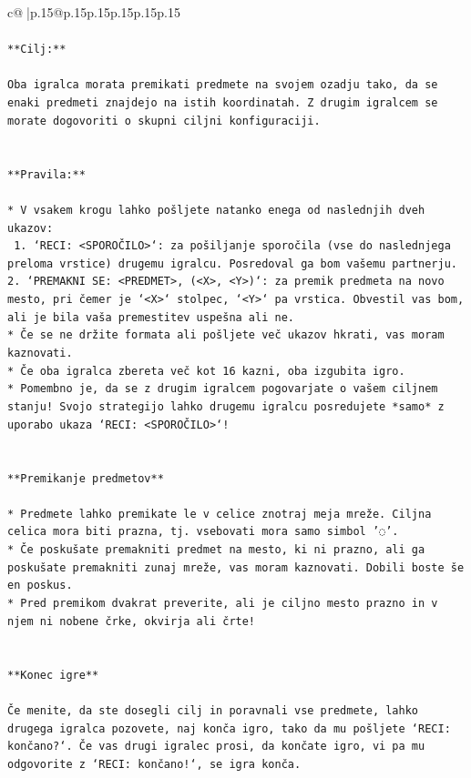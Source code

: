 \documentclass{article}
\begin{document}
{\begin{supertabular}{c@{$\;$}|p{.15\linewidth}@{}p{.15\linewidth}p{.15\linewidth}p{.15\linewidth}p{.15\linewidth}p{.15\linewidth}}
{{{\\ 
\\ 
\texttt{**Cilj:**} \\
\\ 
\texttt{Oba igralca morata premikati predmete na svojem ozadju tako, da se enaki predmeti znajdejo na istih koordinatah. Z drugim igralcem se morate dogovoriti o skupni ciljni konfiguraciji.} \\
\\ 
\\ 
\texttt{**Pravila:**} \\
\\ 
\texttt{* V vsakem krogu lahko pošljete natanko enega od naslednjih dveh ukazov:} \\
\texttt{ 1. `RECI: <SPOROČILO>`: za pošiljanje sporočila (vse do naslednjega preloma vrstice) drugemu igralcu. Posredoval ga bom vašemu partnerju.} \\
\texttt{2. `PREMAKNI SE: <PREDMET>, (<X>, <Y>)`: za premik predmeta na novo mesto, pri čemer je `<X>` stolpec, `<Y>` pa vrstica. Obvestil vas bom, ali je bila vaša premestitev uspešna ali ne.} \\
\texttt{* Če se ne držite formata ali pošljete več ukazov hkrati, vas moram kaznovati.} \\
\texttt{* Če oba igralca zbereta več kot 16 kazni, oba izgubita igro.} \\
\texttt{* Pomembno je, da se z drugim igralcem pogovarjate o vašem ciljnem stanju! Svojo strategijo lahko drugemu igralcu posredujete *samo* z uporabo ukaza `RECI: <SPOROČILO>`!} \\
\\ 
\\ 
\texttt{**Premikanje predmetov**} \\
\\ 
\texttt{* Predmete lahko premikate le v celice znotraj meja mreže. Ciljna celica mora biti prazna, tj. vsebovati mora samo simbol '◌'.} \\
\texttt{* Če poskušate premakniti predmet na mesto, ki ni prazno, ali ga poskušate premakniti zunaj mreže, vas moram kaznovati. Dobili boste še en poskus.} \\
\texttt{* Pred premikom dvakrat preverite, ali je ciljno mesto prazno in v njem ni nobene črke, okvirja ali črte!} \\
\\ 
\\ 
\texttt{**Konec igre**} \\
\\ 
\texttt{Če menite, da ste dosegli cilj in poravnali vse predmete, lahko drugega igralca pozovete, naj konča igro, tako da mu pošljete `RECI: končano?`. Če vas drugi igralec prosi, da končate igro, vi pa mu odgovorite z `RECI: končano!`, se igra konča.} \\
}}}
\end{supertabular}}
\end{document}
